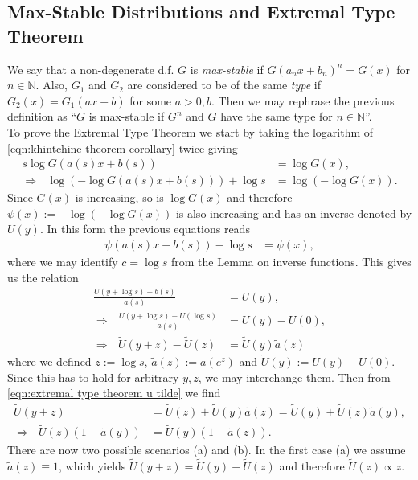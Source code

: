 \documentclass[english, parskip=full]{scrartcl}
\newcommand{\kla}{}
\begin{document}
\subsection{Max-Stable Distributions and Extremal Type Theorem}
We say that a non-degenerate d.f. $G$ is \emph{max-stable} if $G(a_n x + b_n)^n = G(x)$ for $n\in\mathbb{N}$.
Also, $G_1$ and $G_2$ are considered to be of the same \emph{type} if $G_2(x) = G_1(ax+b)$ for some $a>0,b$.
Then we may rephrase the previous definition as ``$G$ is max-stable if $G^n$ and $G$ have the same type for $n\in\mathbb{N}$''.\\
To prove the Extremal Type Theorem we start by taking the logarithm of \autoref{eqn:khintchine theorem corollary} twice giving
\begin{align}
s\log G(a(s)x + b(s)) &= \log G(x),\\
\Rightarrow\ \ \ \log \kla\left( -\log G(a(s)x + b(s)) \right) + \log s &= \log (-\log G(x)).
\end{align}
Since $G(x)$ is increasing, so is $\log G(x)$ and therefore $\psi(x) := -\log(-\log G(x))$ is also increasing and has an inverse denoted by $U(y)$.
In this form the previous equations reads
\begin{align}
\psi(a(s)x + b(s)) - \log s &= \psi(x),
\end{align}
where we may identify $c=\log s$ from the Lemma on inverse functions.
This gives us the relation
\begin{align}
\frac{U(y + \log s) - b(s)}{a(s)} &= U(y),\\
\Rightarrow\ \ \ \frac{U(y + \log s) - U(\log s)}{a(s)} &= U(y) - U(0),\\
\Rightarrow\ \ \ \tilde{U}(y+z) - \tilde{U}(z) &= \tilde{U}(y) \tilde{a}(z) \label{eqn:extremal type theorem u tilde}
\end{align}
where we defined $z := \log s$, $\tilde{a}(z) := a(e^z)$ and $\tilde{U}(y) := U(y) - U(0)$.
Since this has to hold for arbitrary $y,z$, we may interchange them.
Then from \autoref{eqn:extremal type theorem u tilde} we find
\begin{align}
\tilde{U}(y+z) &= \tilde{U}(z) + \tilde{U}(y) \tilde{a}(z) = \tilde{U}(y) + \tilde{U}(z) \tilde{a}(y),\\
\Rightarrow\ \ \  \tilde{U}(z) \kla\left( 1 - \tilde{a}(y) \right) &= \tilde{U}(y) \kla\left( 1 - \tilde{a}(z) \right). \label{eqn:extremal type theorem u tilde v2}
\end{align}
There are now two possible scenarios (a) and (b).
In the first case (a) we assume $\tilde{a}(z) \equiv 1$, which yields $\tilde{U}(y+z) = \tilde{U}(y) + \tilde{U}(z)$ and therefore $\tilde{U}(z) \propto z$.
\end{document}
